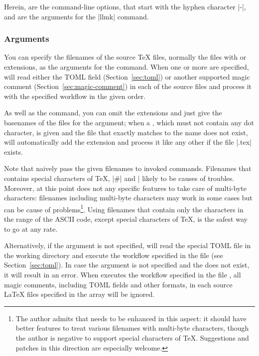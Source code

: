 \documentclass{llmk-doc}
\begin{document}
Herein,  are the command-line options, that start with the hyphen
character |-|, and  are the arguments for the |llmk| command.

\subsubsection*{Arguments }

You can specify the filenames of the source {\TeX} files, normally the files
with  or  extensions, as the arguments for the 
command. When one or more  are specified,  will read
either the TOML field (Section~\ref{sec:toml}) or another supported magic
comment (Section~\ref{sec:magic-comment}) in each of the source files and
process it with the specified workflow in the given order.

As well as the  command, you can omit the  extensions and
just give the basenames of the files for the argument; when a ,
which must not contain any dot character, is given and the file that exactly
matches to the name does not exist,  will automatically add the
 extension and process it like any other if the file
|.tex| exists.

Note that  naively pass the given filenames to invoked commands.
Filenames that contains special characters of {\TeX}, \eg |#| and |%
likely to be causes of troubles. Moreover, at this point  does not
any specific features to take care of multi-byte characters: filenames
including multi-byte characters may work in some cases but can be cause of
problems\footnote{The author admits that  needs to be enhanced in
this aspect: it should have better features to treat various filenames with
multi-byte characters, though the author is negative to support special
characters of {\TeX}. Suggestions and patches in this direction are especially
welcome.}. Using filenames that contain only the characters in the range of the
ASCII code, except special characters of {\TeX}, is the safest way to go at any
rate.

Alternatively, if the argument is not specified,  will read the
special TOML file  in the working directory and execute the
workflow specified in the file (see Section~\ref{sec:toml}). In case the
argument is not specified and the  does not exist, it will
result in an error. When  executes the workflow specified in the
file , all magic comments, including TOML fields and other
formats, in each source {\LaTeX} files specified in the  array
will be ignored.
\end{document}
